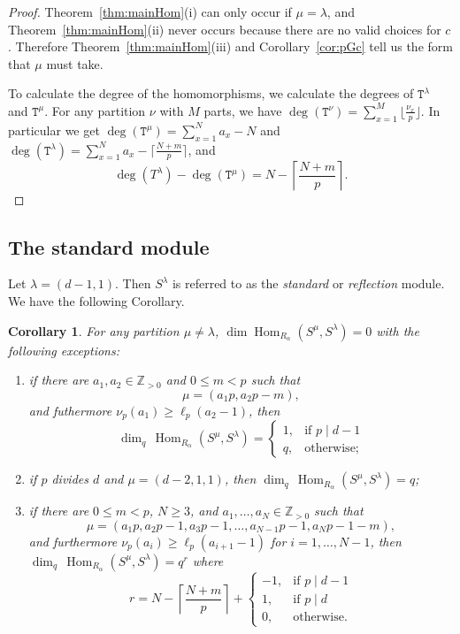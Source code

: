 \documentclass[twoside,11pt,reqno,letter]{amsart}
\numberwithin{equation}{section}
\newtheorem{Corollary}[equation]{Corollary}
\theoremstyle{definition}  %
\newcommand{\Hom}{\operatorname{Hom}}
\def\qdim{{\operatorname{dim}_q}\,}
\newcommand{\Z}{\mathbb{Z}}
\newcommand{\0}{{\bar 0}}
\newcommand{\1}{{\bar 1}}
\newcommand{\la}{\lambda}
\newcommand{\al}{\alpha}
\def\T{{\mathtt T}}
\begin{document}
{\begin{proof}
  Theorem~\ref{thm:mainHom}(i) can only occur if $\mu = \la$, and Theorem~\ref{thm:mainHom}(ii) never occurs because there are no valid choices for $c$. Therefore Theorem~\ref{thm:mainHom}(iii) and Corollary~\ref{cor:pGc} tell us the form that $\mu$ must take.

  To calculate the degree of the homomorphisms, we calculate the degrees of $\T^\la$ and $\T^\mu$. For any partition $\nu$ with $M$ parts, we have $\deg(\T^\nu) = \sum_{x=1}^M \lfloor \frac{\nu_x}{p} \rfloor$. In particular we get $\deg(\T^\mu) = \sum_{x=1}^N a_x - N$ and $\deg(\T^\la) = \sum_{x=1}^N a_x - \lceil \frac{N+m}{p} \rceil$, and
  $$\deg(T^\la) - \deg(\T^\mu) = N-\left\lceil \frac{N+m}{p} \right\rceil.$$
\end{proof}

\subsection{The standard module}

Let $\la = (d-1, 1)$. Then $S^\la$ is referred to as the \emph{standard} or \emph{reflection} module. We have the following Corollary.

\begin{Corollary}
For any partition $\mu \neq \la$, $\dim \Hom_{R_\al}(S^\mu, S^\la) = 0$ with the following exceptions:
\begin{enumerate}
  \item if there are $a_1, a_2 \in \Z_{>0}$ and $0 \leq m < p$ such that
    $$\mu = (a_1 p, a_2 p - m),$$
  and futhermore $\nu_p(a_1) \geq \ell_p(a_2-1)$, then
    $$\qdim \Hom_{R_\al}(S^\mu, S^\la) = \begin{cases} 1, &\text{if } p \mid d-1\\
        q, &\text{otherwise;} \end{cases}$$
  \item if $p$ divides $d$ and $\mu = (d-2, 1, 1)$, then $\qdim \Hom_{R_\al}(S^\mu, S^\la) = q$;
  \item if there are $0 \leq m < p$, $N \geq 3$, and $a_1, \dots, a_N \in \Z_{>0}$ such that
    $$\mu = (a_1p, a_2p-1, a_3p-1, \dots, a_{N-1}p-1,a_Np-1-m),$$
  and furthermore $\nu_p(a_i) \geq \ell_p(a_{i+1}-1)$ for $i = 1,\dots,N-1$, then
  $\qdim \Hom_{R_\al}(S^\mu, S^\la) = q^r$ where
  $$r = N-\left\lceil \frac{N+m}{p} \right\rceil + \begin{cases} -1, &\text{if } p \mid d-1\\
        1, &\text{if } p \mid d\\
        0, &\text{otherwise.} \end{cases}$$
\end{enumerate}
\end{Corollary}

}
\end{document}
